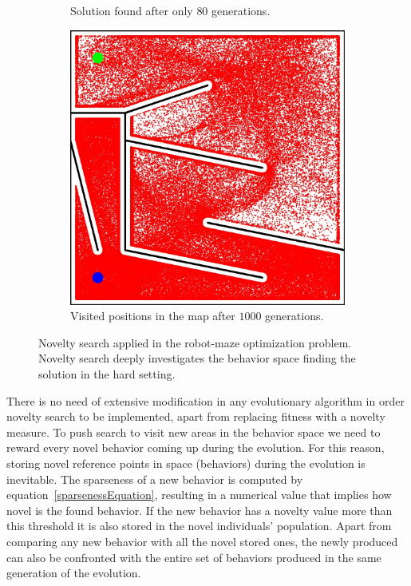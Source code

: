 \begin{figure}[t!]
\begin{subfigure}[b]{0.3\textwidth}
\caption{Solution found after only $80$ generations.}
\label{fig:mazeNoveltyHardSolution}
\end{subfigure}\hspace{0.3cm}
\begin{subfigure}[b]{0.3\textwidth}
\includegraphics[width=1.0\textwidth]{../Figures/Misc/MazeHardNovelty.jpg}
\caption{ Visited positions in the map after $1000$ generations.}
\label{fig:mazeNoveltyHard}
\end{subfigure}
\caption{Novelty search applied in the robot-maze optimization problem. Novelty search deeply investigates the behavior space finding the solution in the hard setting.}
\label{fig:mazeNovelty}
\end{figure}

There is no need of extensive modification in any evolutionary algorithm in order novelty search to be implemented, apart from replacing fitness with a novelty measure. To push search to visit new areas in the behavior space we need to reward every novel behavior coming up during the evolution. For this reason, storing novel reference points in space (behaviors) during the evolution is inevitable. The sparseness of a new behavior is computed by equation~\ref{sparsenessEquation}, resulting in a numerical value that implies how novel is the found behavior. If the new behavior has a novelty value more than this threshold it is also stored in the novel individuals' population. Apart from comparing any new behavior with all the novel stored ones, the newly produced can also be confronted with the entire set of behaviors produced in the same generation of the evolution. 


